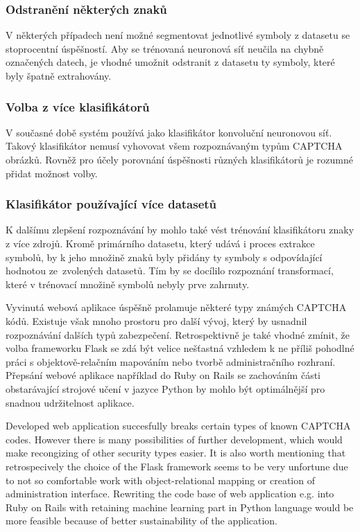 \documentclass[
  field=ainfp,
  master=true,
  biblatex,
  sourcecodes=false,
  theorems=false,
  glossaries,
  index
]{kidiplom}
\begin{document}
\subsubsection*{Odstranění některých znaků}
V některých případech není možné segmentovat jednotlivé symboly z datasetu se stoprocentní úspěšností. Aby se trénovaná neuronová síť neučila na chybně označených datech, je vhodné umožnit odstranit z datasetu ty symboly, které byly špatně extrahovány.

\subsubsection*{Volba z více klasifikátorů} 
V současné době systém používá jako klasifikátor konvoluční neuronovou síť. Takový klasifikátor nemusí vyhovovat všem rozpoznávaným typům CAPTCHA obrázků. Rovněž pro účely porovnání úspěšnosti různých klasifikátorů je rozumné přidat možnost volby.

\subsubsection*{Klasifikátor používající více datasetů} 
K dalšímu zlepšení rozpoznávání by mohlo také vést trénování klasifikátoru znaky z více zdrojů. Kromě primárního datasetu, který udává i proces extrakce symbolů, by k jeho množině znaků byly přidány ty symboly s odpovídající hodnotou ze~zvolených datasetů. Tím by se docílilo rozpoznání transformací, které v trénovací množině symbolů nebyly prve zahrnuty.


\begin{kiconclusions}
Vyvinutá webová aplikace úspěšně prolamuje některé typy známých CAPTCHA kódů. Existuje však mnoho prostoru pro další vývoj, který by usnadnil rozpoz\-návání dalších typů zabezpečení. Retrospektivně je také vhodné zmínit, že volba frameworku Flask se zdá být velice nešťastná vzhledem k ne příliš pohodlné práci s objektově-relačním mapováním nebo tvorbě administračního rozhraní. Přepsání webové aplikace například do Ruby on Rails se zachováním části obstarávající strojové učení v jazyce Python by mohlo být optimálnější pro snadnou udržitelnost aplikace.
\end{kiconclusions}

\begin{kiconclusions}[english]
Developed web application succesfully breaks certain types of known CAPTCHA codes. However there is many possibilities of further development, which would make recongizing of other security types easier.  It is also worth mentioning that retrospecively the choice of the Flask framework seems to be very unfortune due to not so comfortable work with object-relational mapping or creation of administration interface. Rewriting the code base of web application e.g. into Ruby on Rails with retaining machine learning part in Python language would be more feasible because of better sustainability of the application. 
\end{kiconclusions}
\end{document}
